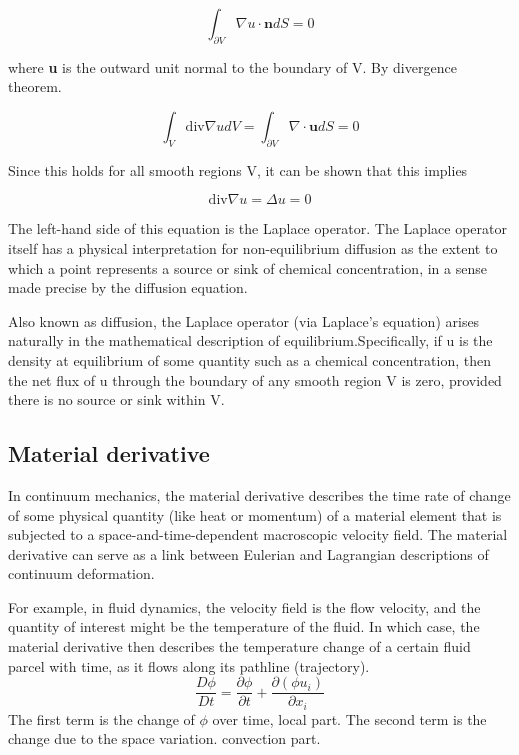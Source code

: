 \documentclass{article}
\begin{document}
\begin{equation}
\int_{\partial V} \nabla u \cdot \mathbf {n} dS = 0
\end{equation}

where \textbf{u} is the outward unit normal to the boundary of V. By divergence theorem. 

\begin{equation}
\int_{V}  \text{div} \nabla u dV = \int_{\partial V} \nabla \cdot \textbf{u} dS = 0
\end{equation}

Since this holds for all smooth regions V, it can be shown that this implies

\begin{equation}
\text{div} \nabla u = \Delta u = 0
\end{equation}

The left-hand side of this equation is the Laplace operator. The Laplace operator itself has a physical interpretation for non-equilibrium diffusion as the extent to which a point represents a source or sink of chemical concentration, in a sense made precise by the diffusion equation.

Also known as diffusion, the Laplace operator (via Laplace's equation) arises naturally in the mathematical description of equilibrium.Specifically, if u is the density at equilibrium of some quantity such as a chemical concentration, then the net flux of u through the boundary of any smooth region V is zero, provided there is no source or sink within V.

\subsection{Material derivative}
In continuum mechanics, the material derivative describes the time rate of change of some physical quantity (like heat or momentum) of a material element that is subjected to a space-and-time-dependent macroscopic velocity field. The material derivative can serve as a link between Eulerian and Lagrangian descriptions of continuum deformation.

For example, in fluid dynamics, the velocity field is the flow velocity, and the quantity of interest might be the temperature of the fluid. In which case, the material derivative then describes the temperature change of a certain fluid parcel with time, as it flows along its pathline (trajectory).
\begin{equation}
\frac{D\phi}{Dt} = \frac{\partial \phi}{\partial t} + \frac{\partial (\phi u_i)}{\partial x_i}
\end{equation}
The first term is the change of $\phi$ over time, local part. The second term is the change due to the space variation. convection part.  
\end{document}
